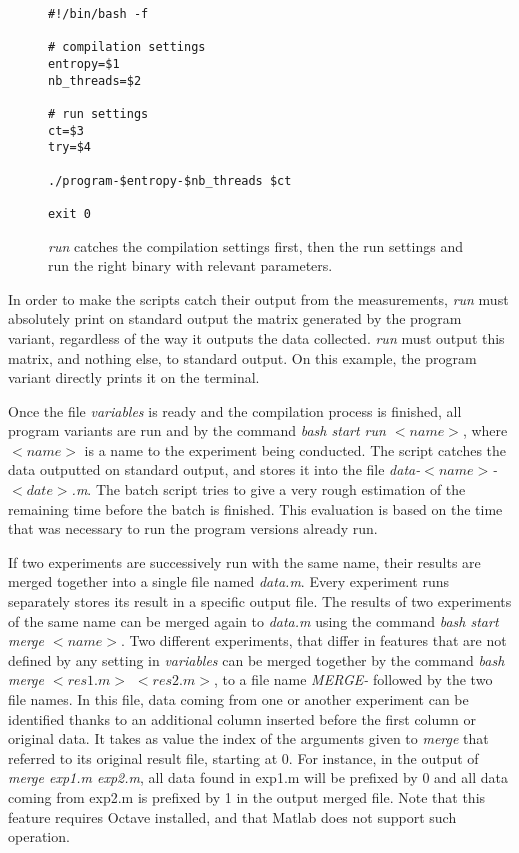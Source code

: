 \begin{figure}
\centering
\begin{lstlisting}
#!/bin/bash -f

# compilation settings
entropy=$1
nb_threads=$2

# run settings
ct=$3
try=$4

./program-$entropy-$nb_threads $ct

exit 0
\end{lstlisting}
\caption{\emph{run} catches the compilation settings first, then the run settings and run the right binary with relevant parameters.}
\label{fig:run}
\end{figure}

In order to make the scripts catch their output from the measurements, \emph{run} must absolutely print on standard output the matrix generated by the program variant, regardless of the way it outputs the data collected. \emph{run} must output this matrix, and nothing else, to standard output. On this example, the program variant directly prints it on the terminal.

Once the file \emph{variables} is ready and the compilation process is finished, all program variants are run and by the command \emph{bash start run $<name>$}, where $<name>$ is a name to the experiment being conducted. The script catches the data outputted on standard output, and stores it into the file \emph{data-$<name>$-$<date>$.m}. The batch script tries to give a very rough estimation of the remaining time before the batch is finished. This evaluation is based on the time that was necessary to run the program versions already run.

If two experiments are successively run with the same name, their results are merged together into a single file named \emph{data.m}. Every experiment runs separately stores its result in a specific output file. The results of two experiments of the same name can be merged again to \emph{data.m} using the command \emph{bash start merge $<name>$}. Two different experiments, that differ in features that are not defined by any setting in \emph{variables} can be merged together by the command \emph{bash merge $<res1.m>$ $<res2.m>$}, to a file name \emph{MERGE-} followed by the two file names. In this file, data coming from one or another experiment can be identified thanks to an additional column inserted before the first column or original data. It takes as value the index of the arguments given to \emph{merge} that referred to its original result file, starting at 0. For instance, in the output of \emph{merge exp1.m exp2.m}, all data found in exp1.m will be prefixed by 0 and all data coming from exp2.m is prefixed by 1 in the output merged file. Note that this feature requires Octave installed, and that Matlab does not support such operation.

